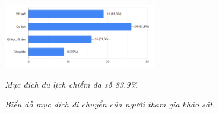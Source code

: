 \begin{center}
\begin{figure}[h]
    \centering
    \includegraphics[width=0.6\textwidth]{assets/chart/1.4.4.png}
    \caption{\textit{Biểu đồ mục đích di chuyển của người tham gia khảo sát.}} \textit{Mục đích du lịch chiếm đa số 83.9\%}
    \label{fig:nhom_phuong_tien}
\end{figure}

\end{center}
\clearpage
\newpage
